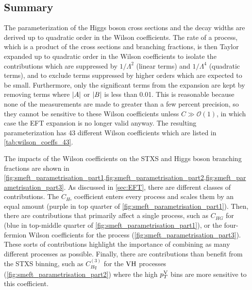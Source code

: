 \subsection{Summary}
The parameterization of the Higgs boson cross sections and the decay widths are derived up to quadratic order in the Wilson coefficients. The rate of a process, which is a product of the cross sections and branching fractions, is then Taylor expanded up to quadratic order in the Wilson coefficients to isolate the contributions which are suppressed by $1/\Lambda^2$ (linear terms) and $1/\Lambda^4$ (quadratic terms), and to exclude terms suppressed by higher orders which are expected to be small. Furthermore, only the significant terms from the expansion are kept by removing terms where $\lvert A \rvert$ or $\lvert B \rvert$ is less than 0.01. This is reasonable because none of the measurements are made to greater than a few percent precision, so they cannot be sensitive to these Wilson coefficients unless $C \gg \mathcal{O}(1)$, in which case the EFT expansion is no longer valid anyway. The resulting parameterization has 43 different Wilson coefficients which are listed in \cref{tab:wilson_coeffs_43}.

The impacts of the Wilson coefficients on the STXS and Higgs boson branching fractions are shown in \cref{fig:smeft_parametrisation_part1,fig:smeft_parametrisation_part2,fig:smeft_parametrisation_part3}. As discussed in \cref{sec:EFT}, there are different classes of contributions. The $C_{H \square}$ coefficient enters every process and scales them by an equal amount (purple in top quarter of \cref{fig:smeft_parametrisation_part1}). Then, there are contributions that primarily affect a single process, such as $C_{HG}$ for \ggH (blue in top-middle quarter of \cref{fig:smeft_parametrisation_part1}), or the four-fermion Wilson coefficients for the \ttH process (\cref{fig:smeft_parametrisation_part3}). These sorts of contributions highlight the importance of combining as many different processes as possible. Finally, there are contributions than benefit from the STXS binning, such as $C_{Hq}^{(3)}$ for the $\mathrm{V}\mathrm{H}$ processes (\cref{fig:smeft_parametrisation_part2}) where the high $p_T^\mathrm{V}$ bins are more sensitive to this coefficient.



